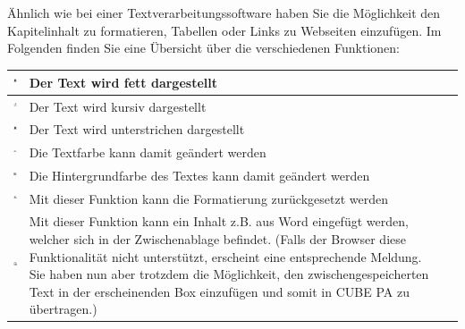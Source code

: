 Ähnlich wie bei einer Textverarbeitungssoftware haben Sie die Möglichkeit den Kapitelinhalt zu formatieren, Tabellen oder Links zu Webseiten einzufügen. Im Folgenden finden Sie eine Übersicht über die verschiedenen Funktionen: \\

\begin{tabular}{c | p{14cm} l} %
\hline
\includegraphics[height=12pt]{../chapters/09_Qualitaetsmanagement/pictures/Format/Fett.jpg} & Der Text wird fett dargestellt \\
\hline
\includegraphics[height=12pt]{../chapters/09_Qualitaetsmanagement/pictures/Format/Kursiv.jpg} & Der Text wird kursiv dargestellt \\
\hline
\includegraphics[height=12pt]{../chapters/09_Qualitaetsmanagement/pictures/Format/Unterstrichen.jpg} & Der Text wird unterstrichen dargestellt \\
\hline
\includegraphics[height=12pt]{../chapters/09_Qualitaetsmanagement/pictures/Format/Textfarbe.jpg} & Die Textfarbe kann damit geändert werden \\
\hline
\includegraphics[height=12pt]{../chapters/09_Qualitaetsmanagement/pictures/Format/Hintergrundfarbe.jpg} & Die Hintergrundfarbe des Textes kann damit geändert werden \\
\hline
\includegraphics[height=12pt]{../chapters/09_Qualitaetsmanagement/pictures/Format/Form_z.jpg} & Mit dieser Funktion kann die Formatierung zurückgesetzt werden \\
\hline
\includegraphics[height=12pt]{../chapters/09_Qualitaetsmanagement/pictures/Format/ausWord.jpg} & Mit dieser Funktion kann ein Inhalt z.B. aus Word eingefügt werden, welcher sich in der Zwischenablage befindet. (Falls der Browser diese Funktionalität nicht unterstützt, erscheint eine entsprechende Meldung. Sie haben nun aber trotzdem die Möglichkeit, den zwischengespeicherten Text in der erscheinenden Box einzufügen und somit in CUBE PA zu übertragen.) \\

\end{tabular}
